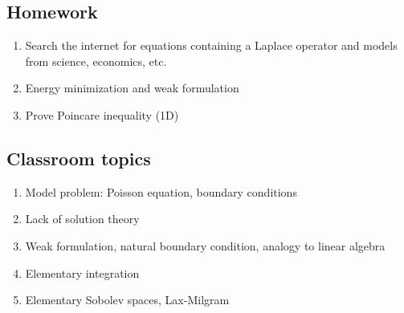 
\subsection{Homework}
\begin{enumerate}
\item Search the internet for equations containing a Laplace operator
  and models from science, economics, etc.
\item Energy minimization and weak formulation
\item Prove Poincare inequality (1D)
\end{enumerate}

\subsection{Classroom topics}
\begin{enumerate}
\item Model problem: Poisson equation, boundary conditions
\item Lack of solution theory
\item Weak formulation, natural boundary condition, analogy to linear algebra
\item Elementary integration
\item Elementary Sobolev spaces, Lax-Milgram
\end{enumerate}

